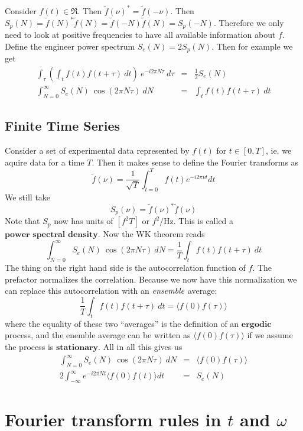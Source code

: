 \documentclass{article}
\begin{document}
Consider $f(t)\in\Re$. Then $\tilde{f}(\nu)^{*}=\tilde{f}(-\nu)$.
Then $S_{p}(N)=\tilde{f}(N)^{*}\tilde{f}(N)=\tilde{f}(-N)\tilde{f}(N)=S_{p}(-N)$.
Therefore we only need to look at positive frequencies to have all
available information about $f$. Define the engineer power spectrum
$S_{e}(N)=2S_{p}(N)$. Then for example we get \begin{eqnarray*}
\int_{\tau}\left(\int_{t}f(t)f(t+\tau)~dt\right)\: e^{-i2\pi N\tau}\: d\tau & = & \frac{1}{2}S_{e}(N)\\
\int_{N=0}^{\infty}S_{e}(N)\:\cos(2\pi N\tau)\: dN & = & \int_{t}f(t)f(t+\tau)\: dt\end{eqnarray*}

\subsection*{Finite Time Series}

Consider a set of experimental data represented by $f(t)$ for $t\in[0,T]$,
ie. we aquire data for a time $T$. Then it makes sense to define
the Fourier transforms as\[
\tilde{f}(\nu)=\frac{1}{\sqrt{T}}\int_{t=0}^{T}f(t)e^{-i2\pi\nu t}dt\]
 We still take\[
S_{p}(\nu)=\tilde{f}(\nu)^{*}\tilde{f}(\nu)\]
 Note that $S_{p}$ now has units of $[f^{2}T]$ or $f^{2}/\textrm{Hz}$.
This is called a $\textbf{power spectral density}$. Now the WK theorem
reads\[
\int_{N=0}^{\infty}S_{e}(N)\:\cos\left(2\pi N\tau\right)\: dN=\frac{1}{T}\int_{t}f(t)f(t+\tau)\: dt\]
 The thing on the right hand side is the autocorrelation function
of $f$. The prefactor normalizes the correlation. Because we now
have this normalization we can replace this autocorrelation with an
$\emph{ensemble}$ average:\[
\frac{1}{T}\int_{t}f(t)f(t+\tau)\: dt=\langle f(0)f(\tau)\rangle\]
 where the equality of these two {}``averages'' is the definition
of an $\textbf{ergodic}$ process, and the enemble average can be
written as $\langle f(0)f(\tau)\rangle$ if we assume the process
is $\textbf{stationary}$. All in all this gives us\begin{eqnarray*}
\int_{N=0}^{\infty}S_{e}(N)\:\cos\left(2\pi N\tau\right)\: dN & = & \langle f(0)f(\tau)\rangle\\
2\int_{-\infty}^{\infty}e^{-i2\pi Nt}\langle f(0)f(t)\rangle dt & = & S_{e}(N)\end{eqnarray*}


\section*{Fourier transform rules in $t$ and $\omega$}
\end{document}
